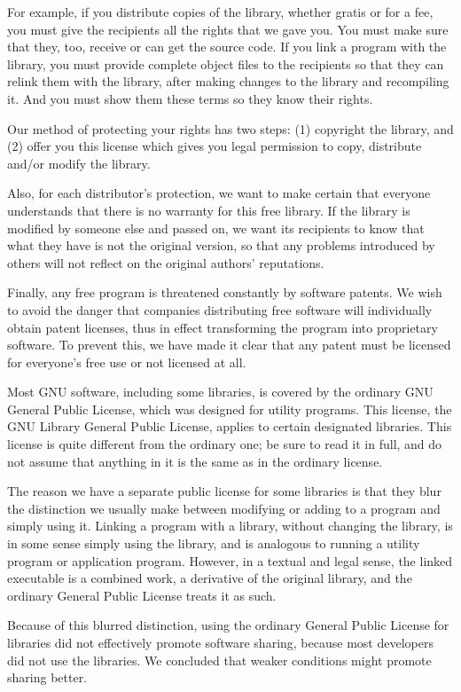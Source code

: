 \documentclass[twoside]{tceusermanual}
\begin{document}
For example, if you distribute copies of the library, whether
gratis or for a fee, you must give the recipients all the rights
that we gave you.  You must make sure that they, too, receive or
can get the source code.  If you link a program with the
library, you must provide complete object files to the
recipients so that they can relink them with the library, after
making changes to the library and recompiling it.  And you must
show them these terms so they know their rights.

Our method of protecting your rights has two steps: (1)
copyright the library, and (2) offer you this license which
gives you legal permission to copy, distribute and/or modify the
library.

Also, for each distributor's protection, we want to make certain
that everyone understands that there is no warranty for this
free library.  If the library is modified by someone else and
passed on, we want its recipients to know that what they have is
not the original version, so that any problems introduced by
others will not reflect on the original authors' reputations.
 
Finally, any free program is threatened constantly by software
patents.  We wish to avoid the danger that companies
distributing free software will individually obtain patent
licenses, thus in effect transforming the program into
proprietary software.  To prevent this, we have made it clear
that any patent must be licensed for everyone's free use or not
licensed at all.

Most GNU software, including some libraries, is covered by the
ordinary GNU General Public License, which was designed for
utility programs.  This license, the GNU Library General Public
License, applies to certain designated libraries.  This license
is quite different from the ordinary one; be sure to read it in
full, and do not assume that anything in it is the same as in the
ordinary license.

The reason we have a separate public license for some libraries
is that they blur the distinction we usually make between
modifying or adding to a program and simply using it.  Linking a
program with a library, without changing the library, is in some
sense simply using the library, and is analogous to running a
utility program or application program.  However, in a textual
and legal sense, the linked executable is a combined work, a
derivative of the original library, and the ordinary General
Public License treats it as such.

Because of this blurred distinction, using the ordinary General
Public License for libraries did not effectively promote
software sharing, because most developers did not use the
libraries.  We concluded that weaker conditions might promote
sharing better.
\end{document}
